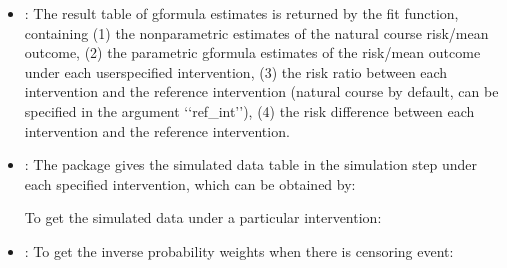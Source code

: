 \documentclass[letterpaper,10pt,english]{sphinxmanual}
\begin{document}
\begin{itemize}
\item {} 
\sphinxAtStartPar
{}: The result table of g\sphinxhyphen{}formula estimates is returned by the fit function, containing (1) the nonparametric estimates
of the natural course risk/mean outcome, (2) the parametric g\sphinxhyphen{}formula estimates of the risk/mean outcome under each user\sphinxhyphen{}specified intervention,
(3) the risk ratio between each intervention and the reference intervention (natural course by default, can be specified in the argument ‘‘ref\_int’’),
(4) the risk difference between each intervention and the reference intervention.

\item {} 
\sphinxAtStartPar
{}: The package gives the simulated data table in the simulation step under
each specified intervention, which can be obtained by:
\begin{quote}

\begin{sphinxVerbatim}[commandchars=\\\{\}]
  \PYG{p}{[}\PYG{p}{]}
\end{sphinxVerbatim}
\end{quote}

\sphinxAtStartPar
To get the simulated data under a particular intervention:
\begin{quote}

\begin{sphinxVerbatim}[commandchars=\\\{\}]
  \PYG{p}{[}\PYG{p}{]}\PYG{p}{[}\PYG{p}{]}
\end{sphinxVerbatim}
\end{quote}

\item {} 
\sphinxAtStartPar
{}: To get the inverse probability weights when there is censoring event:
\begin{quote}

\begin{sphinxVerbatim}[commandchars=\\\{\}]
  \PYG{p}{[}\PYG{p}{]}
\end{sphinxVerbatim}
\end{quote}


\end{itemize}
\end{document}
